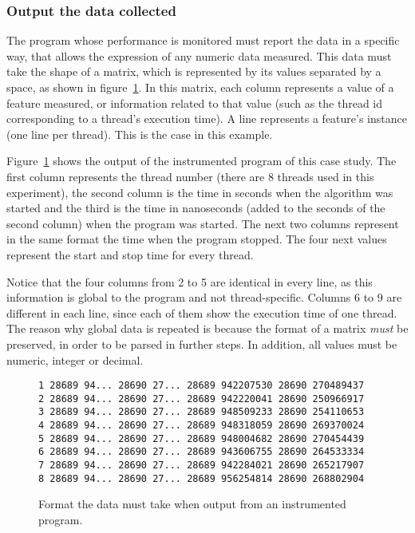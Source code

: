 \subsubsection{Output the data collected}

The program whose performance is monitored must report the data in a specific way, that allows the expression of any numeric data measured. This data must take the shape of a matrix, which is represented by its values separated by a space, as shown in figure~\ref{fig:output}. In this matrix, each column represents a value of a feature measured, or information related to that value (such as the thread id corresponding to a thread's execution time). A line represents a feature's instance (one line per thread). This is the case in this example.

Figure~\ref{fig:output} shows the output of the instrumented program of this case study. The first column represents the thread number (there are 8 threads used in this experiment), the second column is the time in seconds when the algorithm was started and the third is the time in nanoseconds (added to the seconds of the second column) when the program was started. The next two columns represent in the same format the time when the program stopped. The four next values represent the start and stop time for every thread. 

Notice that the four columns from 2 to 5 are identical in every line, as this information is global to the program and not thread-specific. Columns 6 to 9 are different in each line, since each of them show the execution time of one thread. The reason why global data is repeated is because the format of a matrix \emph{must} be preserved, in order to be parsed in further steps. In addition, all values must be numeric, integer or decimal.

\begin{figure}
\centering
\begin{lstlisting}
1 28689 94... 28690 27... 28689 942207530 28690 270489437
2 28689 94... 28690 27... 28689 942220041 28690 250966917
3 28689 94... 28690 27... 28689 948509233 28690 254110653
4 28689 94... 28690 27... 28689 948318059 28690 269370024
5 28689 94... 28690 27... 28689 948004682 28690 270454439
6 28689 94... 28690 27... 28689 943606755 28690 264533334
7 28689 94... 28690 27... 28689 942284021 28690 265217907
8 28689 94... 28690 27... 28689 956254814 28690 268802904
\end{lstlisting}
\caption{Format the data must take when output from an instrumented program.}
\label{fig:output}
\end{figure}

